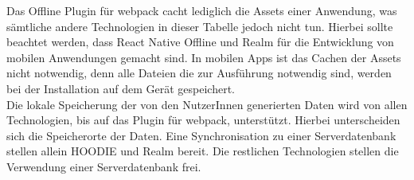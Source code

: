 %
%
%
Das Offline Plugin für webpack cacht lediglich die \gls{Assets} einer Anwendung, was sämtliche andere Technologien in dieser Tabelle jedoch nicht tun.
Hierbei sollte beachtet werden, dass React Native Offline und Realm für die Entwicklung von mobilen Anwendungen gemacht sind.
In mobilen \glspl{App} ist das Cachen der \gls{Assets} nicht notwendig, denn alle Dateien die zur Ausführung notwendig sind, werden bei der Installation auf dem Gerät gespeichert.\\
Die lokale Speicherung der von den NutzerInnen generierten Daten wird von allen Technologien, bis auf das Plugin für webpack, unterstützt. Hierbei unterscheiden sich die Speicherorte der Daten.
Eine Synchronisation zu einer Serverdatenbank stellen allein HOODIE und Realm bereit. Die restlichen Technologien stellen die Verwendung einer Serverdatenbank frei.